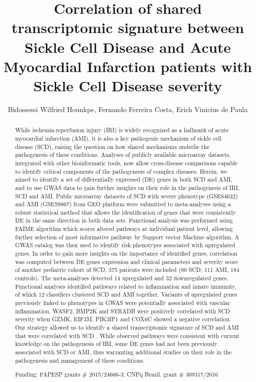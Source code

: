 \documentclass[twoside]{article}
\title{\vspace{-15mm}\fontsize{24pt}{10pt}\selectfont\textbf{ Correlation of shared transcriptomic signature between Sickle Cell Disease and Acute Myocardial Infarction patients with Sickle Cell Disease severity }} %
\author{ Bidossessi Wilfried Hounkpe, Fernando Ferreira Costa, Erich Vinicius de Paula }
\affil{ Faculty of Medical Sciences,  Unicamp }
\date{}
\begin{document}
  
  
  \maketitle %
  
  
  \thispagestyle{fancy} %
  
  
  \begin{abstract}
  While ischemia-reperfusion injury (IRI) is widely recognized as a hallmark of acute myocardial infarction (AMI),  it is also a key pathogenic mechanism of sickle cell disease (SCD),  raising the question on how shared mechanisms underlie the pathogenesis of these conditions. Analyses of publicly available microarray datasets,  integrated with other bioinformatic tools,  now allow cross-disease comparisons capable to identify critical components of the pathogenesis of complex diseases. Herein,  we aimed to identify a set of differentially expressed (DE) genes in both SCD and AMI,  and to use GWAS data to gain further insights on their role in the pathogenesis of IRI,  SCD and AMI. Public microarray datasets of SCD with severe phenotype (GSE84632) and AMI (GSE59867) from GEO platform were submitted to meta-analyses using a robust statistical method that allows the identification of genes that were consistently DE in the same direction in both data sets. Functional analysis was performed using FAIME algorithm which scores altered pathways at individual patient level,  allowing further selection of most informative pathway by Support vector Machine algorithm. A GWAS catalog was then used to identify risk phenotypes associated with upregulated genes. In order to gain more insights on the importance of identified genes,  correlation was computed between DE genes expression and clinical parameters and severity score of another pediatric cohort of SCD. 375 patients were included (80 SCD,  111 AMI,  184 controls). The meta-analyses detected 14 upregulated and 32 downregulated genes. Functional analyses identified pathways related to inflammation and innate immunity,  of which 12 classifiers clustered SCD and AMI together. Variants of upregulated genes previously linked to phenotypes in GWAS were potentially associated with vascular inflammation. WASF2,  BMP2K and STRADB were positively correlated with SCD severity when GZMK,  EIF3M,  PIK3IP1 and COX6C showed a negative correlation. Our strategy allowed us to identify a shared transcriptomic signature of SCD and AMI that were correlated with SCD . While observed pathways were consistent with current knowledge on the pathogenesis of IRI,  some DE genes had not been previously associated with SCD or AMI,  thus warranting additional studies on their role in the pathogenesis and management of these conditions.
  
  Funding: FAPESP grants \# 2015/24666-3; CNPq Brazil. grant \# 309317/2016 \\ 
  \end{abstract}
  
\end{document}
